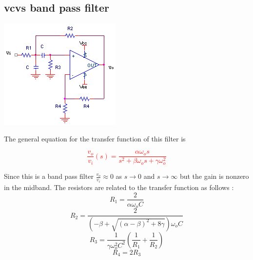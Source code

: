 \subsection{\ac{vcvs} band pass filter}
\begin{center}
	\includegraphics{schematics/vcvs_bandpass.PNG}
\end{center}
The general equation for the transfer function of this filter is

\textcolor{red}{
\begin{equation}
\frac{v_{o}}{v_{i}}(s) = \frac{\alpha \omega_{o}s}{s^{2}+\beta \omega_{o}s + \gamma \omega_{o}^{2}}
\label{eq:vcvs_bandpass}
\end{equation}
}

Since this is a band pass filter $\frac{v_{o}}{v_{i}} \approx 0$ as $s \rightarrow 0$ and $s \rightarrow \infty$ but the gain is nonzero in the midband. The resistors are related to the transfer function as follows \autocite[138-139]{op-amp-circuits-johnson}:
\begin{equation}
R_1 = \frac{2}{\alpha \omega_{o}C}
\end{equation}
\begin{equation}
R_2 = \frac{2}{(-\beta+\sqrt{(\alpha - \beta)^2 + 8\gamma})\omega_{o}C}
\end{equation}
\begin{equation}
R_3 = \frac{1}{\gamma \omega_{o}^2 C^2}\left(\frac{1}{R_1} + \frac{1}{R_2}\right)
\end{equation}
\begin{equation}
R_4 = 2R_3
\end{equation}

